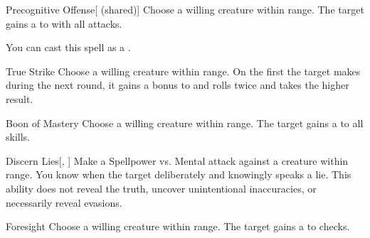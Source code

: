 \begin{ability}[\nth{1}]{Precognitive Offense}[ (shared)]
Choose a willing creature within \rngclose range.
The target gains a   to  with all attacks.

You can cast this spell as a .
\end{ability}
\vspace{0.25em}


\begin{ability}[\nth{1}]{True Strike}
Choose a willing creature within \rngclose range.
On the first  the target makes during the next round, it gains a  bonus to  and rolls twice and takes the higher result.
\end{ability}
\vspace{0.25em}


\begin{ability}[\nth{2}]{Boon of Mastery}
Choose a willing creature within \rngclose range.
The target gains a   to all skills.
\end{ability}
\vspace{0.25em}


\begin{ability}[\nth{2}]{Discern Lies}[, ]
Make a Spellpower vs. Mental attack against a creature within \rngmed range.
\hit You know when the target deliberately and knowingly speaks a lie.
This ability does not reveal the truth, uncover unintentional inaccuracies, or necessarily reveal evasions.
\end{ability}
\vspace{0.25em}


\begin{ability}[\nth{2}]{Foresight}
Choose a willing creature within \rngclose range.
The target gains a   to  checks.
\end{ability}
\vspace{0.25em}


